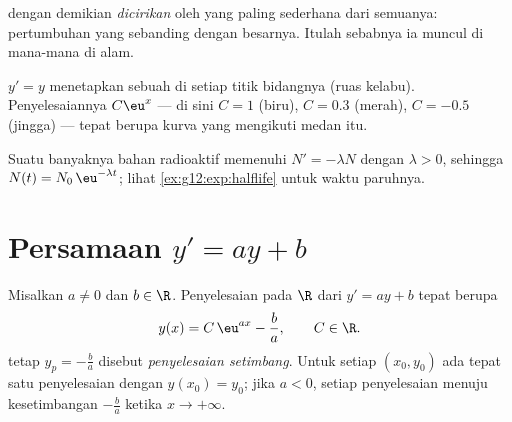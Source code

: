 \begin{remark}
 dengan demikian \emph{dicirikan} oleh 
yang paling sederhana dari semuanya: pertumbuhan yang sebanding dengan
besarnya. Itulah sebabnya ia muncul di mana-mana di alam.
\end{remark}

\begin{omfigure}

{\small {} $y' = y$ menetapkan sebuah  di setiap titik
bidangnya (ruas kelabu). Penyelesaiannya $C\eu^{x}$ --- di sini $C = 1$ (biru),
$C = 0.3$ (merah), $C = -0.5$ (jingga) --- tepat berupa kurva yang
mengikuti medan  itu.}
\end{omfigure}

\begin{example}\label{ex:g12:diffeq:decay}
Suatu banyaknya bahan radioaktif memenuhi $N' = -\lambda N$ dengan $\lambda > 0$,
sehingga $N(t) = N_0\,\eu^{-\lambda t}$; lihat \cref{ex:g12:exp:halflife} untuk
waktu paruhnya.
\end{example}

\section{Persamaan \texorpdfstring{$y' = ay + b$}{y' = ay + b}}

\begin{theorem}[Penyelesaian $y' = ay + b$]\label{thm:g12:diffeq:affine}
Misalkan $a \neq 0$ dan $b \in \R$. Penyelesaian pada $\R$ dari $y' = ay + b$
tepat berupa 
\[
y(x) = C\,\eu^{ax} - \frac{b}{a}, \qquad C \in \R .
\]
 tetap $y_p = -\frac ba$ disebut \emph{penyelesaian setimbang}.
Untuk setiap $(x_0, y_0)$ ada tepat satu penyelesaian dengan $y(x_0) = y_0$; jika
$a < 0$, setiap penyelesaian menuju kesetimbangan $-\frac ba$ ketika
$x \to +\infty$.
\end{theorem}

